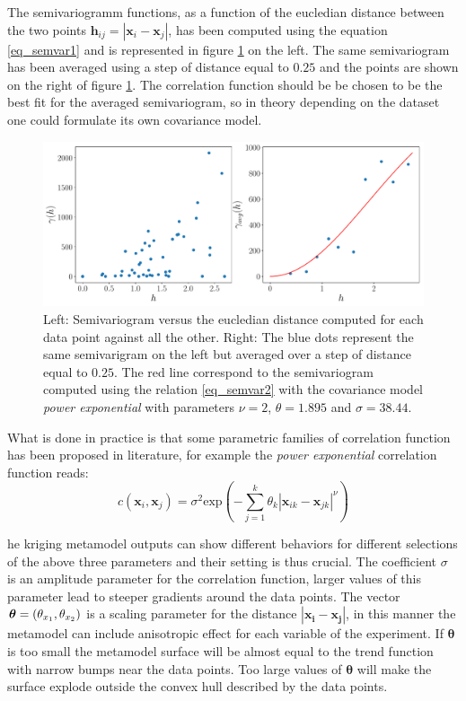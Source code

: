 The semivariogramm functions, as a function of the eucledian distance between the two points $\mathbf{h}_{ij} = |\mathbf{x}_i - \mathbf{x}_j|$, has been computed using the equation \eqref{eq_semvar1} and is represented in figure \ref{fig:semivariogram} on the left. The same semivariogram has been averaged using a step of distance equal to $0.25$ and the points are shown on the right of figure \ref{fig:semivariogram}.
The correlation function should be be chosen to be the best fit for the averaged semivariogram, so in theory depending on the dataset one could formulate its own covariance model.

\begin{figure}[ht]
	\centering
	\includegraphics[width=0.9\linewidth]{appendix_a/sem}
	\caption{Left: Semivariogram versus the eucledian distance computed for each data point against all the other.  Right: The blue dots represent the same semivarigram on the left but averaged over a step of distance equal to $0.25$. The red line correspond to the semivariogram computed using the relation \eqref{eq_semvar2} with the covariance model \textit{power exponential} with parameters $\nu=2$, $\theta=1.895$ and $\sigma=38.44$.}
	\label{fig:semivariogram}
\end{figure}

What is done in practice is that some parametric families of correlation function has been proposed in literature, for example the \textit{power exponential} correlation function reads:
\begin{equation}
c(\mathbf{x}_{i} , \mathbf{x}_{j})  = \sigma^2 \textrm{exp}\left( -\sum_{j=1}^{k} \theta_k {|\mathbf{x}_{ik} - \mathbf{x}_{jk} |}^\nu \right)
\end{equation}

he kriging metamodel outputs can show different behaviors for different selections of the above three parameters and their setting is thus crucial.
The coefficient $\sigma$ is an amplitude parameter for the correlation function, larger values of this parameter lead to steeper gradients around the data points. The vector $\boldsymbol{\theta}=(\theta_{x_1}, \theta_{x_2})$ is a scaling parameter for the distance $|\mathbf{x_i} - \mathbf{x_j}|$, in this manner the metamodel can include anisotropic effect for each variable of the experiment. If $\boldsymbol{\theta}$ is too small the metamodel surface will be almost equal to the trend function with narrow bumps near the data points. Too large values of $\boldsymbol{\theta}$ will make the surface explode outside the convex hull described by the data points.

